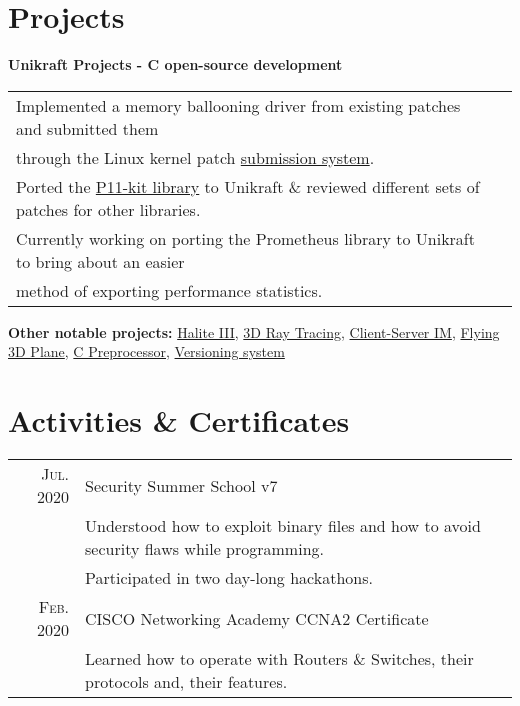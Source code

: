 \documentclass[a4paper,10pt]{article}
\begin{document}
\section{Projects}
\begin{flushleft}
	\textbf{Unikraft Projects - C open-source development}
\end{flushleft}
\begin{tabular}{ll}
	\textbullet\enspace\enspace Implemented a memory ballooning driver from existing patches and submitted them \\
	\enspace\enspace\enspace    through the Linux kernel patch \href{https://patchwork.unikraft.org/project/unikraft/list/?series=1532}{submission system}. \\
	\textbullet\enspace\enspace Ported the \href{https://github.com/cs-pub-ro/unikraft-p11-kit}{P11-kit library} to Unikraft \& reviewed different sets of patches for other libraries. \\
	\textbullet\enspace\enspace Currently working on porting the Prometheus library to Unikraft to bring about an easier \\
	\enspace\enspace\enspace    method of exporting performance statistics.
\end{tabular}

\begin{flushleft}
\textbf{Other notable projects:} 
	\href{https://github.com/craciunoiuc/Halite-III}{Halite III},
	\href{https://github.com/craciunoiuc/computer-graphics-2}{3D Ray Tracing},
	\href{https://github.com/craciunoiuc/network-protocols/tree/master/Client%20-%20Server}{Client-Server IM},
	\href{https://github.com/craciunoiuc/computer-graphics/tree/master/Source/Teme/Flying%203D%20Plane}{Flying 3D Plane},
	\href{https://github.com/craciunoiuc/operating-systems/tree/master/1-multi}{C Preprocessor},
	\href{https://github.com/craciunoiuc/oop-homework/tree/master/Version%20Control%20System}{Versioning system}
\end{flushleft}

\section{Activities \& Certificates}
\begin{tabular}{rl}
	\textsc{Jul.} 2020 & Security Summer School v7 \\&
		\textbullet\enspace\enspace Understood how to exploit binary files and how to avoid security flaws while programming. \\&
		\textbullet\enspace\enspace Participated in two day-long hackathons. \\
	\textsc{Feb.} 2020 & CISCO Networking Academy CCNA2 Certificate \\&
		\textbullet\enspace\enspace Learned how to operate with Routers \& Switches, their protocols and, their features.
\end{tabular}
\end{document}
